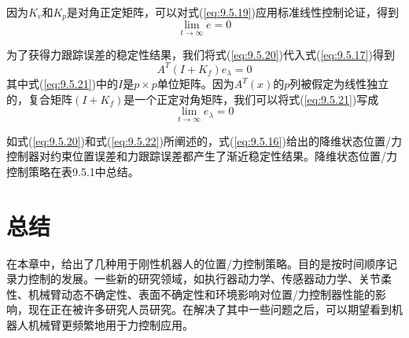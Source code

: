 \documentclass[12pt,a4paper]{ctexart}
\begin{document}
因为$K_v$和$K_p$是对角正定矩阵，可以对式(\ref{eq:9.5.19})应用标准线性控制论证，得到
\begin{equation}\label{eq:9.5.20}
\lim_{t \to \infty} e = 0
\end{equation}

为了获得力跟踪误差的稳定性结果，我们将式(\ref{eq:9.5.20})代入式(\ref{eq:9.5.17})得到
\begin{equation}\label{eq:9.5.21}
A^T(I + K_f)e_\lambda = 0
\end{equation}
其中式(\ref{eq:9.5.21})中的$I$是$p \times p$单位矩阵。因为$A^T(x)$的$p$列被假定为线性独立的，复合矩阵$(I + K_f)$是一个正定对角矩阵，我们可以将式(\ref{eq:9.5.21})写成
\begin{equation}\label{eq:9.5.22}
\lim_{t \to \infty} e_\lambda = 0
\end{equation}

如式(\ref{eq:9.5.20})和式(\ref{eq:9.5.22})所阐述的，式(\ref{eq:9.5.16})给出的降维状态位置/力控制器对约束位置误差和力跟踪误差都产生了渐近稳定性结果。降维状态位置/力控制策略在表9.5.1中总结。

\section{总结}\label{sec:9.6}

在本章中，给出了几种用于刚性机器人的位置/力控制策略。目的是按时间顺序记录力控制的发展。一些新的研究领域，如执行器动力学、传感器动力学、关节柔性、机械臂动态不确定性、表面不确定性和环境影响对位置/力控制器性能的影响，现在正在被许多研究人员研究。在解决了其中一些问题之后，可以期望看到机器人机械臂更频繁地用于力控制应用。
\end{document}
